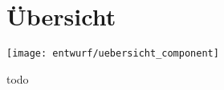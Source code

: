 \section{Übersicht} \label{sec:Übersicht}
\begin{center}
	\texttt{[image: entwurf/uebersicht\_component]}
\end{center}
todo